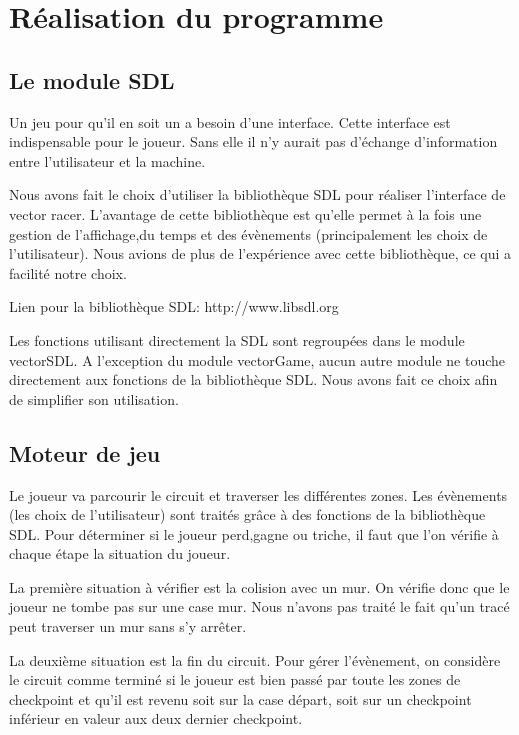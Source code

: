 \chapter{Réalisation du programme}


\section{Le module SDL}

Un jeu pour qu'il en soit un a besoin d'une interface. Cette interface est indispensable pour le joueur. Sans elle il n'y aurait pas d'échange d'information entre l'utilisateur et la machine.

Nous avons fait le choix d'utiliser la bibliothèque SDL pour réaliser l'interface de vector racer. L'avantage de cette bibliothèque est qu'elle permet à la fois une gestion de l'affichage,du temps et des évènements (principalement les choix de l'utilisateur). Nous avions de plus  de l'expérience avec cette bibliothèque, ce qui a facilité notre choix.

Lien pour la bibliothèque SDL: http://www.libsdl.org

Les fonctions utilisant directement la SDL sont regroupées dans le module vectorSDL. A l'exception du module vectorGame, aucun autre module ne touche directement aux fonctions de la bibliothèque SDL. Nous avons fait ce choix afin de simplifier son utilisation.

\section{Moteur de jeu}

Le joueur va parcourir le circuit et traverser les différentes zones. Les évènements (les choix de l'utilisateur) sont traités grâce à des fonctions de la bibliothèque SDL.
Pour déterminer si le joueur perd,gagne ou triche, il faut que l'on vérifie à chaque étape la situation du joueur.

La première situation à vérifier est la colision avec un mur. On vérifie donc que le joueur ne tombe pas sur une case mur.
Nous n'avons pas traité le fait qu'un tracé peut traverser un mur sans s'y arrêter.

La deuxième situation est la fin du circuit. Pour gérer l'évènement, on considère le circuit comme terminé si le joueur est bien passé par toute les zones de checkpoint et qu'il est revenu soit sur la case départ, soit sur un checkpoint inférieur en valeur aux deux dernier checkpoint.

